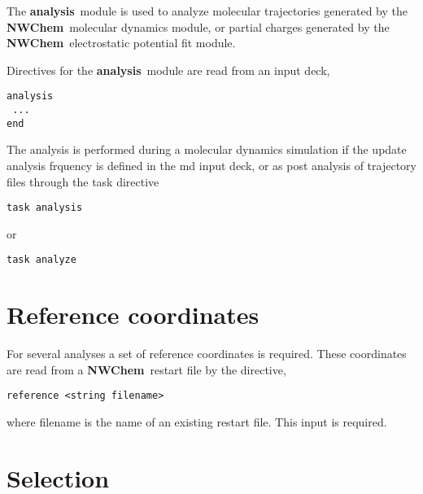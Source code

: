 \label{sec:analysis}
\def\bmu{\mbox{\boldmath $\mu$}}
\def\bE{\mbox{\bf E}}
\def\br{\mbox{\bf r}}
\def\tT{\tilde{T}}
\def\t{\tilde{1}}
\def\ip{i\prime}
\def\jp{j\prime}
\def\ipp{i\prime\prime}
\def\jpp{j\prime\prime}
\def\etal{{\sl et al.}}
\def\nwchem{{\bf NWChem}}
\def\nwargos{{\bf nwargos}}
\def\nwtop{{\bf nwtop}}
\def\nwrst{{\bf nwrst}}
\def\nwsgm{{\bf nwsgm}}
\def\esp{{\bf esp}}
\def\md{{\bf md}}
\def\prepare{{\bf prepare}}
\def\analysis{{\bf analysis}}
\def\argos{{\bf ARGOS}}
\def\amber{{\bf AMBER}}
\def\charmm{{\bf CHARMM}}
\def\discover{{\bf DISCOVER}}
\def\ecce{{\bf ecce}}

The \analysis\ module is used to analyze molecular trajectories generated
by the \nwchem\ molecular dynamics module, or partial charges generated
by the \nwchem\ electrostatic potential fit module.

Directives for the \analysis\ module are read from an input deck,

\begin{verbatim}
analysis
 ...
end
\end{verbatim}

The analysis is performed during a molecular dynamics simulation if the
{\rm update analysis} frquency is defined in the {\rm md} input deck, or
as post analysis of trajectory files through the {\rm task} directive

\begin{verbatim}
task analysis
\end{verbatim}

or

\begin{verbatim}
task analyze
\end{verbatim}

\section{Reference coordinates}

For several analyses a set of reference coordinates is required. These
coordinates are read from a \nwchem\ restart file by the directive,

\begin{verbatim}
reference <string filename>
\end{verbatim}

where {\rm filename} is the name of an existing restart file. This
input is required.

\section{Selection}

